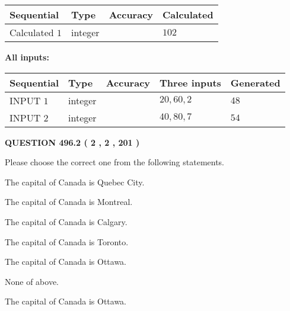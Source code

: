 \documentclass[12pt]{article}
\begin{document}
   
  
  
\noindent\begin{tabular}{|l|l|l|l|}
\hline
 Sequential & Type & Accuracy & Calculated \\ 
\hline
 
 
  Calculated $  1 $ & integer &  & 
  $ 102 $ 
 \\  \hline  
 \end{tabular}
   
   
   
   
\noindent\vspace{0.1in}\hspace{-0.08in} {\textbf{\Large{All inputs: }}}
   
   
  
  
\noindent\begin{tabular}{|l|l|l|l|l|}
\hline
 Sequential & Type & Accuracy & Three inputs & Generated \\ 
\hline
 
 
  INPUT $  1 $ & integer &  & $
 20
 , 
 60
 , 
 2
 $ & $ 48 $ 
 \\  \hline  
 
 
  INPUT $  2 $ & integer &  & $
 40
 , 
 80
 , 
 7
 $ & $ 54 $ 
 \\  \hline  
 \end{tabular}
   
   
  
\vspace{0.2in}
  
{\textbf{\Large{QUESTION
496.2 
 ( 2 , 2 , 201 )
}}}
  
  
Please choose the correct one from the following statements.
 
 
The capital of Canada is Quebec City.
 
 
The capital of Canada is Montreal.
 
 
The capital of Canada is Calgary.
 
 
The capital of Canada is Toronto.
 
 
The capital of Canada is Ottawa.
 
 
 None of above.
 
 
\noindent{}
 
 
The capital of Canada is Ottawa.
 
\end{document}
